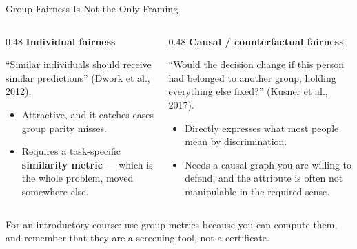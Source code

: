 
\begin{frame}{Group Fairness Is Not the Only Framing}

    \begin{columns}[T]
        \begin{column}{0.48\textwidth}
            \textbf{Individual fairness}
            \vspace{0.3em}

            ``Similar individuals should receive similar predictions'' (Dwork et al., 2012).

            \vspace{0.5em}
            \begin{itemize}\small
                \setlength\itemsep{0.3em}
                \item Attractive, and it catches cases group parity misses.
                \item Requires a task-specific \textbf{similarity metric} --- which is the whole
                      problem, moved somewhere else.
            \end{itemize}
        \end{column}
        \begin{column}{0.48\textwidth}
            \textbf{Causal / counterfactual fairness}
            \vspace{0.3em}

            ``Would the decision change if this person had belonged to another group, holding
            everything else fixed?'' (Kusner et al., 2017).

            \vspace{0.5em}
            \begin{itemize}\small
                \setlength\itemsep{0.3em}
                \item Directly expresses what most people mean by discrimination.
                \item Needs a causal graph you are willing to defend, and the attribute is often
                      not manipulable in the required sense.
            \end{itemize}
        \end{column}
    \end{columns}

    \vspace{1em}
    \begin{block}{}
        \centering
        \small For an introductory course: use group metrics because you can compute them, and
        remember that they are a screening tool, not a certificate.
    \end{block}
\end{frame}
